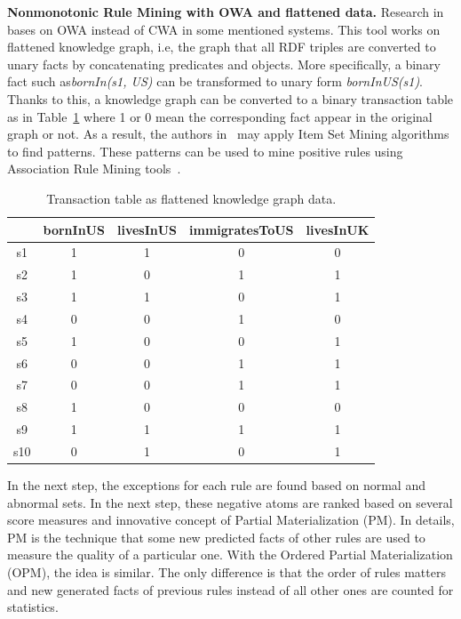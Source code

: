 \textbf{Nonmonotonic Rule Mining with OWA and flattened data.} Research in ~\cite{ref12} bases on OWA instead of CWA in some mentioned systems. This tool works on flattened knowledge graph, i.e, the graph that all RDF triples are converted to unary facts by concatenating predicates and objects. More specifically, a binary fact such as\textit{bornIn(s1, US)} can be transformed to unary form \textit{bornInUS(s1)}. Thanks to this, a knowledge graph can be converted to a binary transaction table as in Table~\ref{table2} where 1 or 0 mean the corresponding fact appear in the original graph or not. As a result, the authors in~\cite{ref12} may apply Item Set Mining algorithms to find patterns. These patterns can be used to mine positive rules using Association Rule Mining tools~\cite{ref13}.

\begin{table}
\begin{center}
\begin{tabular}{|c|c|c|c|c|}
\hline
 & bornInUS & livesInUS & immigratesToUS & livesInUK\\
\hline\hline
s1 & 1 & 1 & 0 & 0\\
\hline
s2 & 1 & 0 & 1 & 1\\
\hline
s3 & 1 & 1 & 0 & 1\\
\hline
s4 & 0 & 0 & 1 & 0\\
\hline
s5 & 1 & 0 & 0 & 1\\
\hline
s6 & 0 & 0 & 1 & 1\\
\hline
s7 & 0 & 0 & 1 & 1\\
\hline
s8 & 1 & 0 & 0 & 0\\
\hline
s9 & 1 & 1 & 1 & 1\\
\hline
s10 & 0 & 1 & 0 & 1\\
\hline
\end{tabular}
\end{center}
\caption{Transaction table as flattened knowledge graph data.}
\label{table2}
\end{table}

In the next step, the exceptions for each rule are found based on normal and abnormal sets. In the next step, these negative atoms are ranked based on several score measures and innovative concept of Partial Materialization (PM). In details, PM is the technique that some new predicted facts of other rules are used to measure the quality of a particular one. With the Ordered Partial Materialization (OPM), the idea is similar. The only difference is that the order of rules matters and new generated facts of previous rules instead of all other ones are counted for statistics.

